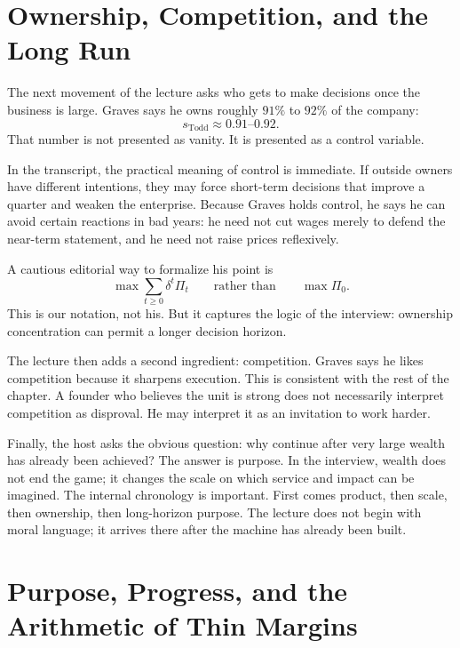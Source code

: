 \section{Ownership, Competition, and the Long Run}

The next movement of the lecture asks who gets to make decisions once the business is large. Graves says he owns roughly \(91\%\) to \(92\%\) of the company:
\begin{equation}
s_{\mathrm{Todd}} \approx 0.91\text{--}0.92.
\end{equation}
That number is not presented as vanity. It is presented as a control variable.

In the transcript, the practical meaning of control is immediate. If outside owners have different intentions, they may force short-term decisions that improve a quarter and weaken the enterprise. Because Graves holds control, he says he can avoid certain reactions in bad years: he need not cut wages merely to defend the near-term statement, and he need not raise prices reflexively.

A cautious editorial way to formalize his point is
\begin{equation}
\max \sum_{t\ge 0}\delta^t \Pi_t
\qquad \text{rather than} \qquad
\max \Pi_0.
\end{equation}
This is our notation, not his. But it captures the logic of the interview: ownership concentration can permit a longer decision horizon.

The lecture then adds a second ingredient: competition. Graves says he likes competition because it sharpens execution. This is consistent with the rest of the chapter. A founder who believes the unit is strong does not necessarily interpret competition as disproval. He may interpret it as an invitation to work harder.

Finally, the host asks the obvious question: why continue after very large wealth has already been achieved? The answer is purpose. In the interview, wealth does not end the game; it changes the scale on which service and impact can be imagined. The internal chronology is important. First comes product, then scale, then ownership, then long-horizon purpose. The lecture does not begin with moral language; it arrives there after the machine has already been built.

\section{Purpose, Progress, and the Arithmetic of Thin Margins}

